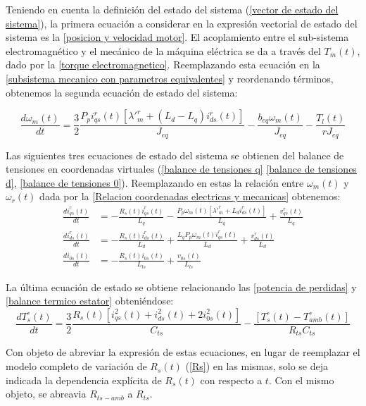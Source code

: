 \documentclass[a4paper, 10pt, onecolumn,journal]{ieeeconf}
\begin{document}
Teniendo en cuenta la definición del estado del sistema (\cref{vector de estado del sistema}), la primera ecuación a considerar en la expresión vectorial de estado del sistema es la
\cref{posicion y velocidad motor}. El acoplamiento entre el sub-sistema electromagnético y el
mecánico de la máquina eléctrica se da a través del $T_m(t)$, dado por la \cref{torque electromagnetico}.
Reemplazando esta ecuación en la \cref{subsistema mecanico con parametros equivalentes} y reordenando términos,
obtenemos la segunda ecuación de estado del sistema:

\begin{equation}
    \frac{d \omega_m(t)}{dt} = \frac{3}{2} \frac{P_p i^r_{qs}(t)\left[\lambda'^r_m + (L_d - L_q) i^r_{ds}(t) \right]}{J_{eq}} - \frac{b_{eq}\omega_m(t)}{J_{eq}} - \frac{T_l(t)}{r J_{eq}}
    \label{ecuacion de estado wm}
\end{equation}

Las siguientes tres ecuaciones de estado del sistema se obtienen del balance de tensiones
en coordenadas virtuales (\cref{balance de tensiones q} \cref{balance de tensiones d}, \cref{balance de tensiones 0}).
Reemplazando en estas la relación entre $\omega_m(t)$ y $\omega_r(t)$ dada por la \cref{Relacion coordenadas electricas y mecanicas} obtenemos:
\begin{align}
    \frac{d i^r_{qs}(t)}{dt} &= -\frac{R_s(t) i^r_{qs}(t)}{L_q} - \frac{P_p \omega_m(t) \left[\lambda'^r_m + L_d i^r_{ds}(t)\right]}{L_q} + \frac{v^r_{qs}(t)}{L_q} \label{ecuacion de estado iqs}\\
    \frac{d i^r_{ds}(t)}{dt} &= -\frac{R_s(t) i^r_{ds}(t)}{L_d} + \frac{L_q P_p \omega_m(t)i^r_{qs}(t)}{L_d}  + \frac{v^r_{ds}(t)}{L_d} \label{ecuacion de estado ids}\\ 
    \frac{d i_{0s}(t)}{dt}   &= -\frac{R_s(t) i_{0s}(t)}{L_{ls}} + \frac{v_{0s}(t)}{L_{ls}}\label{ecuacion de estado i0s}
\end{align}

La última ecuación de estado se obtiene relacionando las \cref{potencia de perdidas} y \cref{balance termico estator} obteniéndose:
\begin{equation}
    \frac{d T^\circ_s(t)}{dt} = \frac{3}{2} \frac{R_s(t) \left[ i_{qs}^2(t) + i_{ds}^2(t) + 2 i_{0s}^2(t) \right]}{C_{ts}} - \frac{\left[T_s^{\circ}(t) - T_{amb}^{\circ}(t)\right]}{R_{ts}C_{ts}} 
    \label{ecuacion de estado Ts}
\end{equation}

Con objeto de abreviar la expresión de estas ecuaciones, en lugar de reemplazar el modelo completo de variación de $R_s(t)$ (\cref{Rs}) en las mismas, 
solo se deja indicada la dependencia explícita de $R_s(t)$ con respecto a $t$. Con el mismo objeto, se abreavia $R_{ts-amb}$ a $R_{ts}$.
\end{document}
